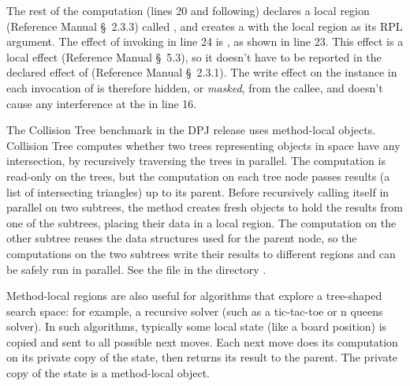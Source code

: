 The rest of the computation (lines 20 and following) declares a local
region (Reference Manual \S~2.3.3) called , and
creates a  with the local region as its RPL argument.
The effect of invoking  in line 24 is
, as shown in line 23.  This effect is a local
effect (Reference Manual \S~5.3), so it doesn't have to be reported in
the declared effect of  (Reference Manual \S~2.3.1).
The write effect on the  instance in each invocation
of  is therefore hidden, or \emph{masked}, from the
callee, and doesn't cause any interference at the  in
line 16.


 The Collision Tree benchmark in the DPJ
release uses method-local objects.  Collision Tree computes whether
two trees representing objects in space have any intersection, by
recursively traversing the trees in parallel.  The computation is
read-only on the trees, but the computation on each tree node passes
results (a list of intersecting triangles) up to its parent.  Before
recursively calling itself in parallel on two subtrees, the
 method creates fresh objects to hold the results
from one of the subtrees, placing their data in a local region.
The computation on the other subtree reuses the data structures 
used for the parent node, so the computations on the two subtrees
write their results to different regions and can be safely run in
parallel.  See the file  in the directory
.

Method-local regions are also useful for algorithms that explore a
tree-shaped search space: for example, a recursive solver (such as a
tic-tac-toe or n queens solver).  In such algorithms, typically some
local state (like a board position) is copied and sent to all possible
next moves.  Each next move does its computation on its private copy
of the state, then returns its result to the parent.  The private copy
of the state is a method-local object.

